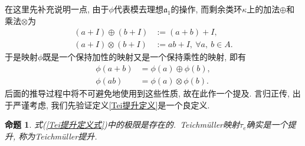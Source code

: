 \documentclass[UTF8, twoside]{ctexart}
\theoremstyle{nonumberplain}
\theoremstyle{nonumberplain}
\theoremstyle{plain}
\newtheorem{mingti4}[dingyi4]{命题}
\begin{document}
	在这里先补充说明一点, 由于$\phi $代表模去理想${{\mathfrak{a}}_{1}}$的操作, 而剩余类环$\kappa $上的加法$\oplus $和乘法$\otimes $为
	\begin{align*}
		\left( a+I \right)\oplus \left( b+I \right)&:=\left( a+b \right)+I, \\ 
		\left( a+I \right)\otimes \left( b+I \right)&:=ab+I,\   
		\forall a,\ b\in A.
	\end{align*}
	于是映射$\phi $既是一个保持加性的映射又是一个保持乘性的映射, 即有
	\begin{align*}
		\phi \left( a+b \right)&=\phi \left( a \right)\oplus \phi \left( b \right), \\ 
		\phi \left( ab \right)&=\phi \left( a \right)\otimes \phi \left( b \right). 
	\end{align*}
	后面的推导过程中将不可避免地使用到这些性质, 故在此作一个提及. 言归正传, 出于严谨考虑, 我们先验证定义\ref{Tei提升定义}是一个良定义.
	\begin{mingti4} \label{Tei提升良定义}
		式(\ref{Tei提升定义式})中的极限是存在的.\  Teichmüller映射${{\tau }_{e}}$确实是一个提升,
		称为{\heiti Teichmüller提升}.
	\end{mingti4}
\end{document}
